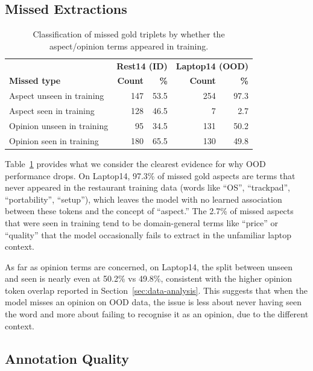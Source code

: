 \documentclass[12pt,a4paper]{report}
\begin{document}
\subsection{Missed Extractions}

\begin{table}[H]
\centering
\caption{Classification of missed gold triplets by whether the aspect/opinion terms appeared in training.}
\label{tab:errors-missed}
\small
\begin{tabular}{@{}lrrrr@{}}
\toprule
& \multicolumn{2}{c}{\textbf{Rest14 (ID)}} & \multicolumn{2}{c}{\textbf{Laptop14 (OOD)}} \\
\textbf{Missed type} & \textbf{Count} & \textbf{\%} & \textbf{Count} & \textbf{\%} \\
\midrule
Aspect unseen in training & 147 & 53.5 & 254 & 97.3 \\
Aspect seen in training & 128 & 46.5 & 7 & 2.7 \\
\midrule
Opinion unseen in training & 95 & 34.5 & 131 & 50.2 \\
Opinion seen in training & 180 & 65.5 & 130 & 49.8 \\
\bottomrule
\end{tabular}
\end{table}

Table~\ref{tab:errors-missed} provides what we consider the clearest evidence for why OOD performance drops. On Laptop14, 97.3\% of missed gold aspects are terms that never appeared in the restaurant training data (words like ``OS'', ``trackpad'', ``portability'', ``setup''), which leaves the model with no learned association between these tokens and the concept of ``aspect.'' The 2.7\% of missed aspects that were seen in training tend to be domain-general terms like ``price'' or ``quality'' that the model occasionally fails to extract in the unfamiliar laptop context.

As far as opinion terms are concerned, on Laptop14, the split between unseen and seen is nearly even at 50.2\% vs 49.8\%, consistent with the higher opinion token overlap reported in Section~\ref{sec:data-analysis}. This suggests that when the model misses an opinion on OOD data, the issue is less about never having seen the word and more about failing to recognise it as an opinion, due to the different context.

\subsection{Annotation Quality}
\end{document}

